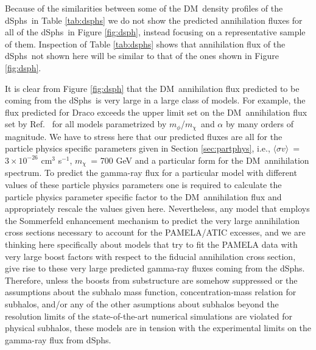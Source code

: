 \documentclass[aps,prd,twocolumn,amsmath,amssymb,floatfix,nofootinbib,10pt]{revtex4}
\newcommand{\ie}{i.e.}
\newcommand{\DM}{DM}
\newcommand{\mdm}{\ensuremath{m_{\chi}}}
\newcommand{\mv}{\ensuremath{m_{\phi}}}
\newcommand{\sigmaannv}{\ensuremath{\langle\sigma v\rangle}}
\newcommand{\dSphs}{dSphs}
\begin{document}
Because of the similarities between some of the \DM\ density profiles
of the \dSphs\ in Table \ref{tab:dsphs} we do not show the predicted
annihilation fluxes for all of the \dSphs\ in Figure \ref{fig:dsph},
instead focusing on a representative sample of them. Inspection of
Table \ref{tab:dsphs} shows that annihilation flux of the \dSphs\ not
shown here will be similar to that of the ones shown in Figure
\ref{fig:dsph}.




It is clear from Figure \ref{fig:dsph} that the \DM\ annihilation flux
predicted to be coming from the \dSphs\ is very large in a large class
of models. For example, the flux predicted for Draco exceeds the upper
limit set on the \DM\ annihilation flux set by
Ref.~\cite{2008ApJ...679..428A} for all models parametrized by
\mv/\mdm\ and $\alpha$ by many orders of magnitude. We have to stress
here that our predicted fluxes are all for the particle physics
specific parameters given in Section \ref{sec:partphys}, \ie,
\sigmaannv\ = $3 \times 10^{-26}$ cm$^3$ s$^{-1}$, \mdm\ = 700 GeV and
a particular form for the \DM\ annihilation spectrum. To predict the
gamma-ray flux for a particular model with different values of these
particle physics parameters one is required to calculate the particle
physics parameter specific factor to the \DM\ annihilation flux and
appropriately rescale the values given here. Nevertheless, any model
that employs the Sommerfeld enhancement mechanism to predict the very
large annihilation cross sections necessary to account for the
PAMELA/ATIC excesses, and we are thinking here specifically about
models that try to fit the PAMELA data with very large boost factors
with respect to the fiducial annihilation cross section, give rise to
these very large predicted gamma-ray fluxes coming from the
\dSphs. Therefore, unless the boosts from substructure are somehow
suppressed or the assumptions about the subhalo mass function,
concentration-mass relation for subhalos, and/or any of the other
asumptions about subhalos beyond the resolution limits of the
state-of-the-art numerical simulations are violated for physical
subhalos, these models are in tension with the experimental limits on
the gamma-ray flux from \dSphs.

\end{document}
